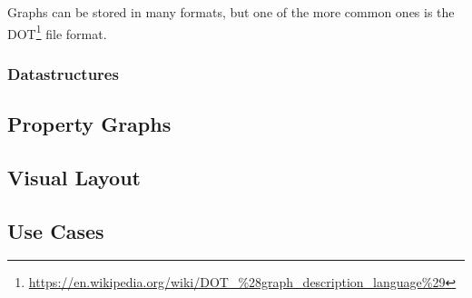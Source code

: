 Graphs can be stored in many formats, but one of the more common ones is the DOT\footnote{ \url{https://en.wikipedia.org/wiki/DOT_\%28graph_description_language\%29} } file format.

\subsubsection{Datastructures}

\subsection{Property Graphs}

\subsection{Visual Layout}

\subsection{Use Cases}

\begin{itemize}
\end{itemize}

